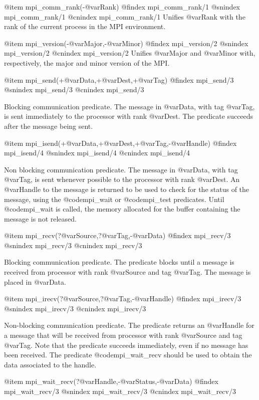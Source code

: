 @item mpi_comm_rank(-@var{Rank})
@findex mpi_comm_rank/1
@snindex mpi_comm_rank/1
@cnindex mpi_comm_rank/1
      Unifies @var{Rank} with the rank of the current process in the MPI environment.

@item mpi_version(-@var{Major},-@var{Minor})
@findex mpi_version/2
@snindex mpi_version/2
@cnindex mpi_version/2
      Unifies @var{Major} and @var{Minor} with, respectively, the major and minor version of the MPI.


@item mpi_send(+@var{Data},+@var{Dest},+@var{Tag})
@findex mpi_send/3
@snindex mpi_send/3
@cnindex mpi_send/3

Blocking communication predicate. The message in @var{Data}, with tag
@var{Tag}, is sent immediately to the processor with rank @var{Dest}.
The predicate succeeds after the message being sent.



@item mpi_isend(+@var{Data},+@var{Dest},+@var{Tag},-@var{Handle})
@findex mpi_isend/4
@snindex mpi_isend/4
@cnindex mpi_isend/4

Non blocking communication predicate. The message in @var{Data}, with
tag @var{Tag}, is sent whenever possible to the processor with rank
@var{Dest}. An @var{Handle} to the message is returned to be used to
check for the status of the message, using the @code{mpi_wait} or
@code{mpi_test} predicates. Until @code{mpi_wait} is called, the
memory allocated for the buffer containing the message is not
released.

@item mpi_recv(?@var{Source},?@var{Tag},-@var{Data})
@findex mpi_recv/3
@snindex mpi_recv/3
@cnindex mpi_recv/3

Blocking communication predicate. The predicate blocks until a message
is received from processor with rank @var{Source} and tag @var{Tag}.
The message is placed in @var{Data}.

@item mpi_irecv(?@var{Source},?@var{Tag},-@var{Handle})
@findex mpi_irecv/3
@snindex mpi_irecv/3
@cnindex mpi_irecv/3

Non-blocking communication predicate. The predicate returns an
@var{Handle} for a message that will be received from processor with
rank @var{Source} and tag @var{Tag}. Note that the predicate succeeds
immediately, even if no message has been received. The predicate
@code{mpi_wait_recv} should be used to obtain the data associated to
the handle.

@item mpi_wait_recv(?@var{Handle},-@var{Status},-@var{Data})
@findex mpi_wait_recv/3
@snindex mpi_wait_recv/3
@cnindex mpi_wait_recv/3

